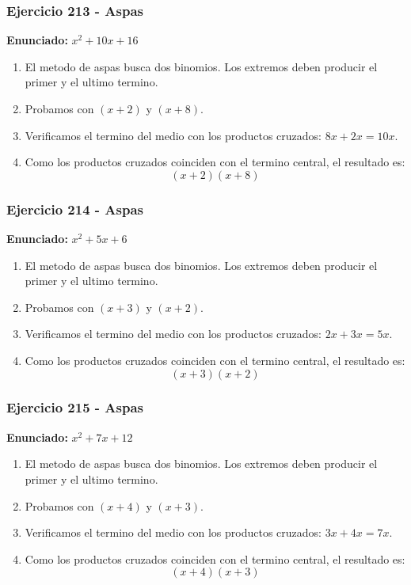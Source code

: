 \documentclass[11pt,a4paper]{article}
\begin{document}
\vspace{0.2cm}
\subsubsection*{Ejercicio 213 - Aspas}
\textbf{Enunciado:} $ x^{2} + 10 x + 16 $\par
\begin{enumerate}[leftmargin=2em]
\item El metodo de aspas busca dos binomios. Los extremos deben producir el primer y el ultimo termino.
\item Probamos con \((x + 2)\) y \((x + 8)\).
\item Verificamos el termino del medio con los productos cruzados: \(8 x+2 x=10 x\).
\item Como los productos cruzados coinciden con el termino central, el resultado es: \[\boxed{\left(x + 2\right)\left(x + 8\right)}\]
\end{enumerate}

\vspace{0.2cm}
\subsubsection*{Ejercicio 214 - Aspas}
\textbf{Enunciado:} $ x^{2} + 5 x + 6 $\par
\begin{enumerate}[leftmargin=2em]
\item El metodo de aspas busca dos binomios. Los extremos deben producir el primer y el ultimo termino.
\item Probamos con \((x + 3)\) y \((x + 2)\).
\item Verificamos el termino del medio con los productos cruzados: \(2 x+3 x=5 x\).
\item Como los productos cruzados coinciden con el termino central, el resultado es: \[\boxed{\left(x + 3\right)\left(x + 2\right)}\]
\end{enumerate}

\vspace{0.2cm}
\subsubsection*{Ejercicio 215 - Aspas}
\textbf{Enunciado:} $ x^{2} + 7 x + 12 $\par
\begin{enumerate}[leftmargin=2em]
\item El metodo de aspas busca dos binomios. Los extremos deben producir el primer y el ultimo termino.
\item Probamos con \((x + 4)\) y \((x + 3)\).
\item Verificamos el termino del medio con los productos cruzados: \(3 x+4 x=7 x\).
\item Como los productos cruzados coinciden con el termino central, el resultado es: \[\boxed{\left(x + 4\right)\left(x + 3\right)}\]
\end{enumerate}
\end{document}
